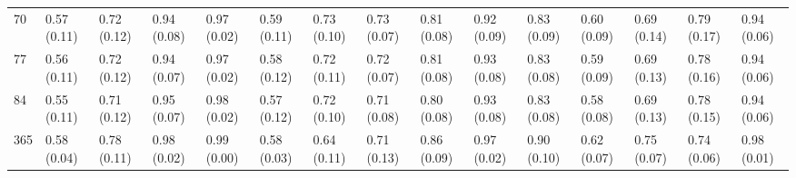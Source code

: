 \begin{tabular}{lllllllllllllll}
70  &  0.57 (0.11) &  0.72 (0.12) &   0.94 (0.08) &  0.97 (0.02) &  0.59 (0.11) &  0.73 (0.10) &  0.73 (0.07) &  0.81 (0.08) &  0.92 (0.09) &  0.83 (0.09) &  0.60 (0.09) &  0.69 (0.14) &  0.79 (0.17) &  0.94 (0.06) \\
77  &  0.56 (0.11) &  0.72 (0.12) &   0.94 (0.07) &  0.97 (0.02) &  0.58 (0.12) &  0.72 (0.11) &  0.72 (0.07) &  0.81 (0.08) &  0.93 (0.08) &  0.83 (0.08) &  0.59 (0.09) &  0.69 (0.13) &  0.78 (0.16) &  0.94 (0.06) \\
84  &  0.55 (0.11) &  0.71 (0.12) &   0.95 (0.07) &  0.98 (0.02) &  0.57 (0.12) &  0.72 (0.10) &  0.71 (0.08) &  0.80 (0.08) &  0.93 (0.08) &  0.83 (0.08) &  0.58 (0.08) &  0.69 (0.13) &  0.78 (0.15) &  0.94 (0.06) \\
365 &  0.58 (0.04) &  0.78 (0.11) &   0.98 (0.02) &  0.99 (0.00) &  0.58 (0.03) &  0.64 (0.11) &  0.71 (0.13) &  0.86 (0.09) &  0.97 (0.02) &  0.90 (0.10) &  0.62 (0.07) &  0.75 (0.07) &  0.74 (0.06) &  0.98 (0.01) \\
\bottomrule
\end{tabular}
